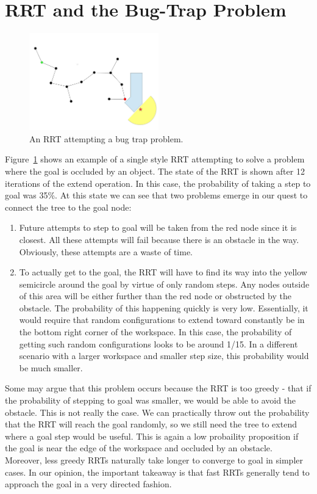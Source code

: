 \documentclass[conference]{IEEEtran}
\begin{document}
\section{RRT and the Bug-Trap Problem}
\label{sec:bugtraprrt}

\begin{figure}[h!]
  \centering
    \includegraphics[width=0.5\textwidth]{figures/bugTrapRRT.jpg}
  \caption{An RRT attempting a bug trap problem. \label{fig:BugTrapRRT} }
\end{figure}

Figure~\ref{fig:BugTrapRRT} shows an example of a single style RRT attempting to solve a problem where the goal is occluded by an object.
The state of the RRT is shown after 12 iterations of the extend operation. In this case, the probability of taking a step to goal was
35\%. At this state we can see that two problems emerge in our quest to connect the tree to the goal node:
\begin{enumerate}
\item Future attempts to step to goal will be taken from the red node since it is closest. All these attempts will fail because there is an
obstacle in the way. Obviously, these attempts are a waste of time.
\item To actually get to the goal, the RRT will have to find its way into the yellow semicircle around the goal by virtue of only random
steps. Any nodes outside of this area will be either further than the red node or obstructed by the obstacle. The probability of this
happening quickly is very low. Essentially, it would require that random configurations to extend toward constantly be in the bottom right
corner of the workspace. In this case, the probability of getting such random configurations looks to be around 1/15. In a different
scenario with a larger workspace and smaller step size, this probability would be much smaller. 
\end{enumerate}

Some may argue that this problem occurs because the RRT is too greedy - that if the probability of stepping to goal was smaller, we would be
able to avoid the obstacle. This is not really the case. We can practically throw out the probability that the RRT will reach the goal
randomly, so we still need the tree to extend where a goal step would be useful. This is again a low probaility proposition if the goal is
near the edge of the workspace and occluded by an obstacle. Moreover, less greedy RRTs naturally take longer to converge to goal in simpler
cases. In our opinion, the important takeaway is that fast RRTs generally tend to approach the goal in a very directed fashion.
\end{document}
